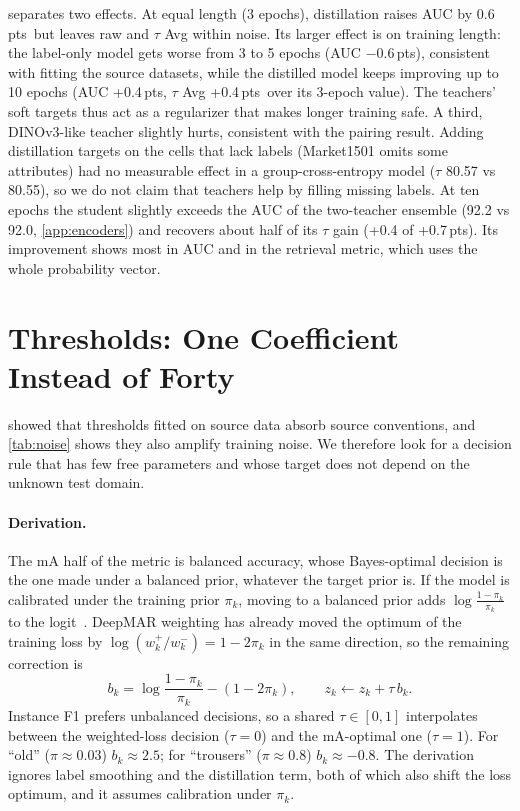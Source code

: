 \documentclass[10pt,twocolumn,letterpaper]{article}
\newcommand{\pts}{\,pts}
\begin{document}
 separates two effects. At equal length (3 epochs), distillation raises AUC by 0.6\pts\ but leaves raw and $\tau$ Avg within noise. Its larger effect is on training length: the label-only model gets worse from 3 to 5 epochs (AUC $-$0.6\pts), consistent with fitting the source datasets, while the distilled model keeps improving up to 10 epochs (AUC +0.4\pts, $\tau$ Avg +0.4\pts\ over its 3-epoch value). The teachers' soft targets thus act as a regularizer that makes longer training safe. A third, DINOv3-like teacher slightly hurts, consistent with the pairing result. Adding distillation targets on the cells that lack labels (Market1501 omits some attributes) had no measurable effect in a group-cross-entropy model ($\tau$ 80.57 vs 80.55), so we do not claim that teachers help by filling missing labels. At ten epochs the student slightly exceeds the AUC of the two-teacher ensemble (92.2 vs 92.0, \cref{app:encoders}) and recovers about half of its $\tau$ gain (+0.4 of +0.7\pts). Its improvement shows most in AUC and in the retrieval metric, which uses the whole probability vector.

\section{Thresholds: One Coefficient Instead of Forty}
\label{sec:rule}

 showed that thresholds fitted on source data absorb source conventions, and \cref{tab:noise} shows they also amplify training noise. We therefore look for a decision rule that has few free parameters and whose target does not depend on the unknown test domain.

\paragraph{Derivation.} The mA half of the metric is balanced accuracy, whose Bayes-optimal decision is the one made under a balanced prior, whatever the target prior is. If the model is calibrated under the training prior $\pi_k$, moving to a balanced prior adds $\log\frac{1-\pi_k}{\pi_k}$ to the logit~\cite{saerens,logitadj}. DeepMAR weighting has already moved the optimum of the training loss by $\log(w_k^+/w_k^-)=1-2\pi_k$ in the same direction, so the remaining correction is
\begin{equation}
b_k=\log\frac{1-\pi_k}{\pi_k}-(1-2\pi_k),\qquad z_k\leftarrow z_k+\tau\,b_k .
\label{eq:rule}
\end{equation}
Instance F1 prefers unbalanced decisions, so a shared $\tau\in[0,1]$ interpolates between the weighted-loss decision ($\tau=0$) and the mA-optimal one ($\tau=1$). For ``old'' ($\pi\approx0.03$) $b_k\approx2.5$; for ``trousers'' ($\pi\approx0.8$) $b_k\approx-0.8$. The derivation ignores label smoothing and the distillation term, both of which also shift the loss optimum, and it assumes calibration under $\pi_k$.
\end{document}
